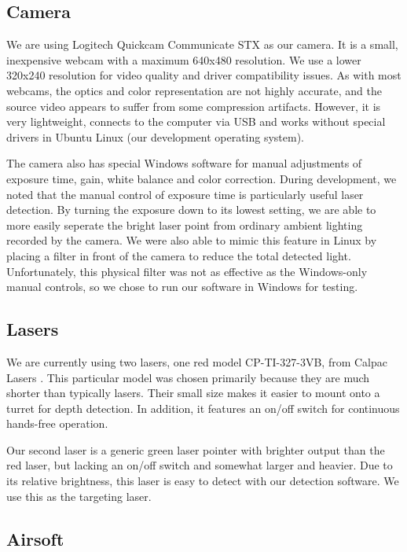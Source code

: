 \documentclass[10pt,twocolumn,letterpaper]{article}
\begin{document}
\subsection{Camera}

We are using Logitech Quickcam Communicate STX \cite{logi} as our camera.  It is a small, inexpensive webcam with a maximum 640x480 resolution.  We use a lower 320x240 resolution for video quality and driver compatibility issues.  As with most webcams, the optics and color representation are not highly accurate, and the source video appears to suffer from some compression artifacts.  However, it is very lightweight, connects to the computer via USB and works without special drivers in Ubuntu Linux (our development operating system).

The camera also has special Windows software for manual adjustments of exposure time, gain, white balance and color correction.  During development, we noted that the manual control of exposure time is particularly useful laser detection.  By turning the exposure down to its lowest setting, we are able to more easily seperate the bright laser point from ordinary ambient lighting recorded by the camera.  We were also able to mimic this feature in Linux by placing a filter in front of the camera to reduce the total detected light.  Unfortunately, this physical filter was not as effective as the Windows-only manual controls, so we chose to run our software in Windows for testing.

\subsection{Lasers}

We are currently using two lasers, one red model CP-TI-327-3VB, from Calpac Lasers \cite{calpac}.  This particular model was chosen primarily because they are much shorter than typically lasers.  Their small size makes it easier to mount onto a turret for depth detection.  In addition, it features an on/off switch for continuous hands-free operation.

Our second laser is a generic green laser pointer with brighter output than the red laser, but lacking an on/off switch and somewhat larger and heavier.  Due to its relative brightness, this laser is easy to detect with our detection software.  We use this as the targeting laser.

\subsection{Airsoft}
\end{document}
